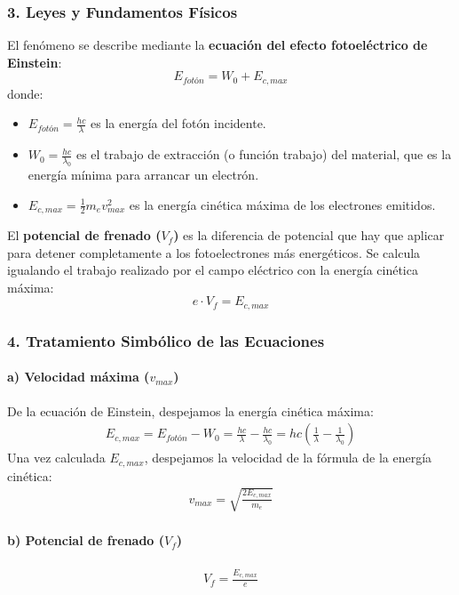 \subsubsection*{3. Leyes y Fundamentos Físicos}
El fenómeno se describe mediante la \textbf{ecuación del efecto fotoeléctrico de Einstein}:
$$ E_{fotón} = W_0 + E_{c,max} $$
donde:
\begin{itemize}
    \item $E_{fotón} = \frac{hc}{\lambda}$ es la energía del fotón incidente.
    \item $W_0 = \frac{hc}{\lambda_0}$ es el trabajo de extracción (o función trabajo) del material, que es la energía mínima para arrancar un electrón.
    \item $E_{c,max} = \frac{1}{2} m_e v_{max}^2$ es la energía cinética máxima de los electrones emitidos.
\end{itemize}
El \textbf{potencial de frenado ($V_f$)} es la diferencia de potencial que hay que aplicar para detener completamente a los fotoelectrones más energéticos. Se calcula igualando el trabajo realizado por el campo eléctrico con la energía cinética máxima:
$$ e \cdot V_f = E_{c,max} $$

\subsubsection*{4. Tratamiento Simbólico de las Ecuaciones}
\paragraph*{a) Velocidad máxima ($v_{max}$)}
De la ecuación de Einstein, despejamos la energía cinética máxima:
\begin{gather}
    E_{c,max} = E_{fotón} - W_0 = \frac{hc}{\lambda} - \frac{hc}{\lambda_0} = hc\left(\frac{1}{\lambda} - \frac{1}{\lambda_0}\right)
\end{gather}
Una vez calculada $E_{c,max}$, despejamos la velocidad de la fórmula de la energía cinética:
\begin{gather}
    v_{max} = \sqrt{\frac{2 E_{c,max}}{m_e}}
\end{gather}

\paragraph*{b) Potencial de frenado ($V_f$)}
\begin{gather}
    V_f = \frac{E_{c,max}}{e}
\end{gather}

